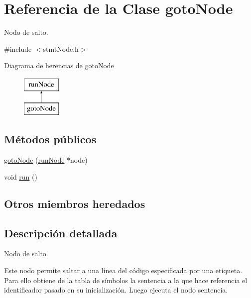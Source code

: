 \hypertarget{classgotoNode}{\section{Referencia de la Clase goto\-Node}
\label{classgotoNode}
}


Nodo de salto.  




{\ttfamily \#include $<$stmt\-Node.\-h$>$}

Diagrama de herencias de goto\-Node\begin{figure}[H]
\begin{center}
\leavevmode
\includegraphics[height=2.000000cm]{classgotoNode}
\end{center}
\end{figure}
\subsection*{Métodos públicos}
\begin{DoxyCompactItemize}
\item 
\hyperlink{classgotoNode_ae43c3a2ab896742001d9a52f8620d325}{goto\-Node} (\hyperlink{classrunNode}{run\-Node} $\ast$node)
\item 
void \hyperlink{classgotoNode_a41280bd7c75f0112336cc2a539433c97}{run} ()
\end{DoxyCompactItemize}
\subsection*{Otros miembros heredados}


\subsection{Descripción detallada}
Nodo de salto. 

Este nodo permite saltar a una línea del código especificada por una etiqueta. Para ello obtiene de la tabla de símbolos la sentencia a la que hace referencia el identificador pasado en su inicialización. Luego ejecuta el nodo sentencia. 

